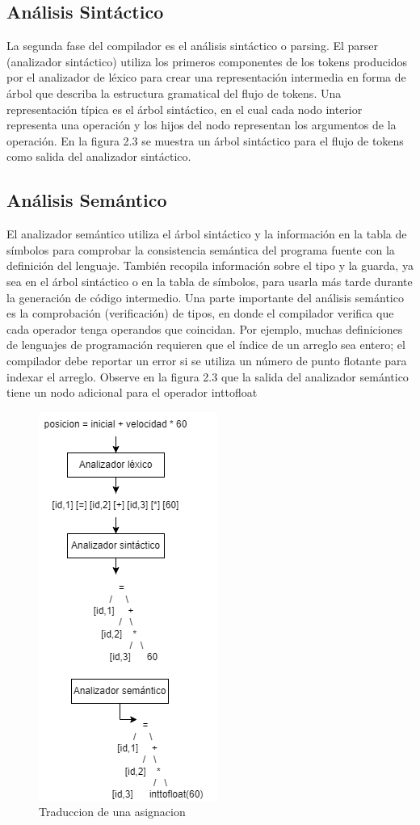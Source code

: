 \subsection{Análisis Sintáctico}
La segunda fase del compilador es el análisis sintáctico o parsing. El parser (analizador sintáctico) utiliza los primeros componentes de los tokens producidos por el analizador de léxico para crear una representación intermedia en forma de árbol que describa la estructura gramatical del flujo de tokens. Una representación típica es el árbol sintáctico, en el cual cada nodo interior representa una operación y los hijos del nodo representan los argumentos de la operación.
En la figura 2.3 se muestra un árbol sintáctico para el flujo de tokens como salida del analizador sintáctico.
\subsection{Análisis Semántico}
El analizador semántico utiliza el árbol sintáctico y la información en la tabla de símbolos para comprobar la consistencia semántica del programa fuente con la definición del lenguaje. También recopila información sobre el tipo y la guarda, ya sea en el árbol sintáctico o en la tabla de símbolos, para usarla más tarde durante la generación de código intermedio.
Una parte importante del análisis semántico es la comprobación (verificación) de tipos, en donde el compilador verifica que cada operador tenga operandos que coincidan. Por ejemplo, muchas definiciones de lenguajes de programación requieren que el índice de un arreglo sea entero; el compilador debe reportar un error si se utiliza un número de punto flotante para indexar el arreglo.
Observe en la figura 2.3 que la salida del
analizador semántico tiene un nodo adicional para el operador inttofloat
\begin{figure}[htb]
\centering
\includegraphics[scale=0.8]{imagenes/traduccionDeAsignacion}
\caption{Traduccion de una asignacion}
\end{figure}
